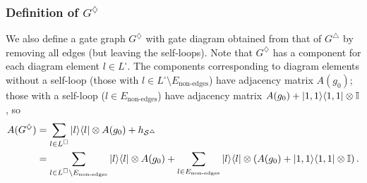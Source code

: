 \documentclass[../thesis-main/thesis-main]{subfiles}
\begin{document}
\begin{comment}
We use the following explicit expressions for the self-loop set and edge set in the gate diagram for $G^{\triangle}$:
\[
\mathcal{S}^{\triangle}=\left\{ (l,1,1):\, l\in E_{\text{non-edges}}\right\} 
\]
\begin{align*}
\mathcal{E}^{\triangle} & =\bigcup_{q=\in[R]}\left(\mathcal{E}_{\text{step1}}^{q}\cup\mathcal{E}_{\text{step4 }}^{q}\right)\\
\mathcal{E}_{\text{step1}}^{q} & =\left\{ (q_{\text{in}},0,7),(d(q,1),0,3)\right\} ,\left\{ (q_{\text{in}},1,5),(d(q,1),1,1)\right\} \\
 & \left(\bigcup_{s=1}^{R-1}\left\{ (d(q,s),0,7),(d(q,s+1),0,3)\right\} \cup\left\{ (d(q,s),1,5),(d(q,s+1),1,1)\right\} \right)\\
 & \bigcup\left\{ (d(q,R),0,7),(q_{\text{out}},0,3)\right\} \cup\left\{ (d(q,R),1,5),(q_{\text{out}}1,1)\right\} \\
\mathcal{E}_{\text{step4}}^{q} & =\left\{ (d(q,s),0,1),(e_{00}(q,s),\alpha(q,s),1)\right\} \cup
\end{align*}
\end{comment}

\subsubsection*{Definition of $G^{\diamondsuit}$}

We also define a gate graph $G^{\diamondsuit}$ with gate diagram obtained from that of $G^{\triangle}$ by removing all edges (but leaving the self-loops). Note that $G^{\diamondsuit}$ has a component for each diagram element $l\in L^{\square}$. The components corresponding to diagram elements without a self-loop (those with $l\in L^{\square}\setminus E_{\text{non-edges}}$) have adjacency matrix $A(g_{0})$; those with a self-loop ($l\in E_{\text{non-edges}}$) have adjacency matrix $A(g_{0})+|1,1\rangle\langle1,1|\otimes\mathbb{I}$, so
\begin{align}
A(G^{\diamondsuit}) & =\sum_{l\in L^{\square}}|l\rangle\langle l|\otimes A(g_{0})+h_{\mathcal{S}^{\triangle}}\label{eq:A_G_diamond_defn_line1}\\
 & =\sum_{l\in L^{\square}\setminus E_{\text{non-edges}}}|l\rangle\langle l|\otimes A(g_{0})+\sum_{l\in E_{\text{non-edges}}}|l\rangle\langle l|\otimes\left(A(g_{0})+|1,1\rangle\langle1,1|\otimes\mathbb{I}\right).\label{eq:A_G_diamond_defn}
\end{align}
\end{document}
